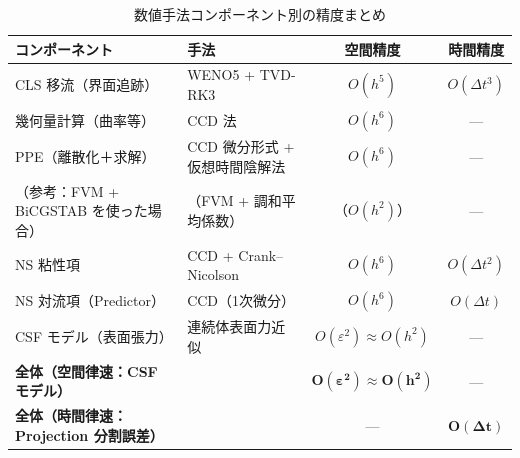 \begin{table}[htbp]
\centering
\caption{数値手法コンポーネント別の精度まとめ}
\label{tab:accuracy_summary}
\renewcommand{\arraystretch}{1.3}
\small
\begin{tabular}{llcc}
\toprule
コンポーネント & 手法 & 空間精度 & 時間精度 \\
\midrule
CLS 移流（界面追跡） & WENO5 + TVD-RK3 & $O(h^5)$ & $O(\Delta t^3)$ \\
幾何量計算（曲率等） & CCD 法 & $O(h^6)$ & — \\
PPE（離散化＋求解） & CCD 微分形式 + 仮想時間陰解法 & $O(h^6)$ & — \\
（参考：FVM + BiCGSTAB を使った場合） & （FVM + 調和平均係数） & （$O(h^2)$） & — \\
NS 粘性項 & CCD + Crank--Nicolson & $O(h^6)$ & $O(\Delta t^2)$ \\
NS 対流項（Predictor） & CCD（1次微分） & $O(h^6)$ & $O(\Delta t)$ \\
CSF モデル（表面張力） & 連続体表面力近似 & $O(\varepsilon^2){\approx}O(h^2)$ & — \\
\midrule
\textbf{全体（空間律速：CSF モデル）} & & $\boldsymbol{O(\varepsilon^2) \approx O(h^2)}$ & — \\
\textbf{全体（時間律速：Projection 分割誤差）} & & — & $\boldsymbol{O(\Delta t)}$ \\
\bottomrule
\end{tabular}
\end{table}

